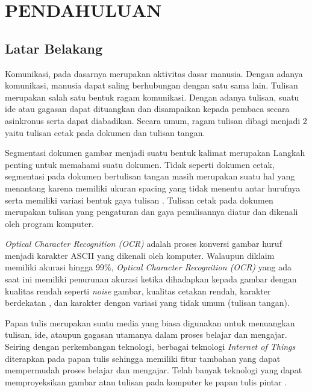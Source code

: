 
\chapter{PENDAHULUAN}
\label{chap:pendahuluan}


\section{Latar Belakang}
\label{sec:latarbelakang}

Komunikasi, pada dasarnya merupakan aktivitas dasar manusia. Dengan adanya komunikasi, manusia dapat saling berhubungan dengan satu sama lain. Tulisan merupakan salah satu bentuk ragam komunikasi. Dengan adanya tulisan, suatu ide atau gagasan dapat dituangkan dan disampaikan kepada pembaca secara asinkronus serta dapat diabadikan. Secara umum, ragam tulisan dibagi menjadi 2 yaitu tulisan cetak pada dokumen dan tulisan tangan.\par
Segmentasi dokumen gambar menjadi suatu bentuk kalimat merupakan Langkah penting untuk memahami suatu dokumen. Tidak seperti dokumen cetak, segmentasi pada dokumen bertulisan tangan masih merupakan suatu hal yang menantang karena memiliki ukuran spacing yang tidak menentu antar hurufnya serta memiliki variasi bentuk gaya tulisan \citep*{ryu2015word}. Tulisan cetak pada dokumen merupakan tulisan yang pengaturan dan gaya penulisannya diatur dan dikenali oleh program komputer.\par
\textit{Optical Character Recognition (OCR)} adalah proses konversi gambar huruf menjadi karakter ASCII yang dikenali oleh komputer. Walaupun diklaim memiliki akurasi hingga 99\%, \textit{Optical Character Recognition (OCR)} yang ada saat ini memiliki penurunan akurasi ketika dihadapkan kepada gambar dengan kualitas rendah seperti \textit{noise} gambar, kualitas cetakan rendah, karakter berdekatan \citep*{ImageMalu2001approachtch}, dan karakter dengan variasi yang tidak umum (tulisan tangan).\par
Papan tulis merupakan suatu media yang biasa digunakan untuk menuangkan tulisan, ide, ataupun gagasan utamanya dalam proses belajar dan mengajar. Seiring dengan perkembangan teknologi, berbagai teknologi \textit{Internet of Things} diterapkan pada papan tulis sehingga memiliki fitur tambahan yang dapat mempermudah proses belajar dan mengajar. Telah banyak teknologi yang dapat memproyeksikan gambar atau tulisan pada komputer ke papan tulis pintar \citep*{kellerman2018smart}. 


